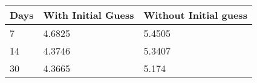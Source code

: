\begin{tabular}{lll}
Days & With Initial Guess & Without Initial guess \\ 
\hline 
7 & 4.6825 & 5.4505 \\ 
14 & 4.3746 & 5.3407 \\ 
30 & 4.3665 & 5.174 \\ 
\hline 
\end{tabular}
